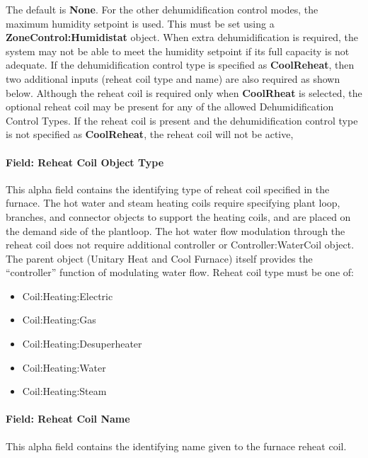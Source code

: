 The default is \textbf{None}. For the other dehumidification control modes, the maximum humidity setpoint is used. This must be set using a \textbf{ZoneControl:Humidistat} object. When extra dehumidification is required, the system may not be able to meet the humidity setpoint if its full capacity is not adequate. If the dehumidification control type is specified as \textbf{CoolReheat}, then two additional inputs (reheat coil type and name) are also required as shown below. Although the reheat coil is required only when \textbf{CoolRheat} is selected, the optional reheat coil may be present for any of the allowed Dehumidification Control Types. If the reheat coil is present and the dehumidification control type is not specified as \textbf{CoolReheat}, the reheat coil will not be active,

\paragraph{Field: Reheat Coil Object Type}\label{field-reheat-coil-object-type-000}

This alpha field contains the identifying type of reheat coil specified in the furnace. The hot water and steam heating coils require specifying plant loop, branches, and connector objects to support the heating coils, and are placed on the demand side of the plantloop. The hot water flow modulation through the reheat coil does not require additional controller or Controller:WaterCoil object. The parent object (Unitary Heat and Cool Furnace) itself provides the ``controller'' function of modulating water flow. Reheat coil type must be one of:

\begin{itemize}
\item
  Coil:Heating:Electric
\item
  Coil:Heating:Gas
\item
  Coil:Heating:Desuperheater
\item
  Coil:Heating:Water
\item
  Coil:Heating:Steam
\end{itemize}

\paragraph{Field: Reheat Coil Name}\label{field-reheat-coil-name-000}

This alpha field contains the identifying name given to the furnace reheat coil.

